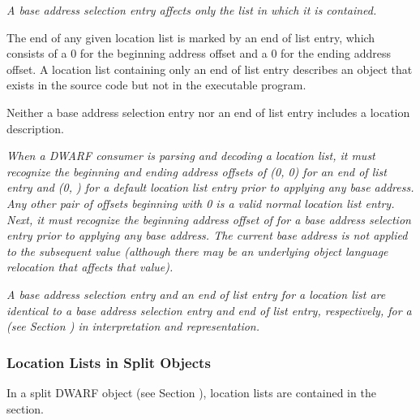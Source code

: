 \textit{A base address selection entry 
affects only the list in which it is contained.}

The end of any given location list is marked by an 
end of list entry, which consists of a 0 for the beginning address
offset and a 0 for the ending address offset. A location list
containing only an 
end of list entry describes an object that
exists in the source code but not in the executable program.

Neither a base address selection entry nor an end of list
entry includes a location description.

\textit{When a DWARF consumer is parsing and decoding a location
list, it must recognize the beginning and ending address
offsets of (0, 0) for an end of list entry and (0, ) for
a default location list entry prior to applying any base
address. Any other pair of offsets beginning with 0 is a
valid normal location list entry. Next, it must recognize the
beginning address offset of  for a base address selection
entry prior to applying any base address. The current base
address is not applied to the subsequent value (although there
may be an underlying object language relocation that affects
that value).}

\textit{A base address selection entry and an end of list
entry for a location list are identical to a base address
selection entry and end of list entry, respectively, for a
(see Section ) 
in interpretation
and representation.}

\subsubsection{Location Lists in Split Objects}
\label{chap:locationlistsinsplitobjects}
In a split DWARF object (see 
Section ), 
location lists are contained in the \dotdebuglocdwo{} section.

